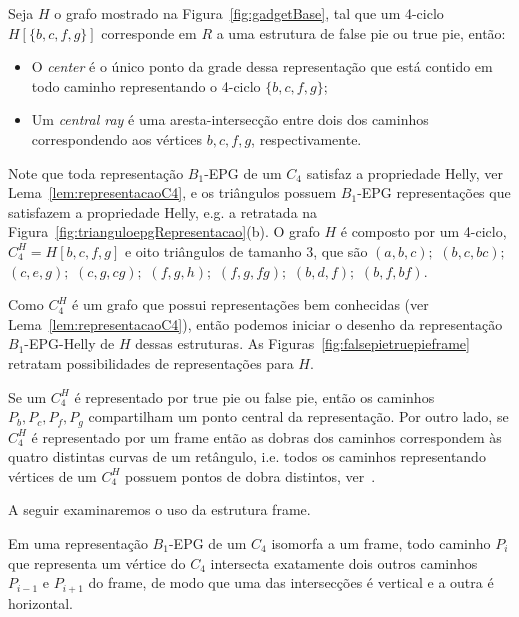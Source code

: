 \begin{definition}
Seja $H$ o grafo mostrado na  Figura~\ref{fig:gadgetBase}, tal que um 4-ciclo $H[\{b, c, f, g \}]$ corresponde em $R$ a uma estrutura de false pie ou true pie, então:

\begin{itemize}
\item O \emph{center} é o único ponto da grade dessa representação que está contido em todo caminho representando o 4-ciclo $ \{b, c, f, g \}$; \label{lab:lab1}

\item Um \emph {central ray} é uma aresta-intersecção entre dois dos caminhos correspondendo aos vértices $ b, c, f, g$, respectivamente.
\end{itemize}
\end{definition}


Note que toda representação $B_1$-EPG de um $C_4$ satisfaz a propriedade Helly, ver Lema~\ref{lem:representacaoC4}, e os triângulos possuem $B_1$-EPG representações que satisfazem a propriedade Helly, e.g. a retratada na Figura~\ref{fig:trianguloepgRepresentacao}(b). O grafo $H$ é composto por um 4-ciclo,  $C_4^{H}=H[b, c, f, g]$ e oito triângulos de tamanho 3, que são $(a,b,c);$ $(b,c,bc);$ $(c,e,g);$ $(c,g,cg);$ $(f,g,h);$ $(f,g,fg);$ $(b,d,f);$ $(b,f,bf).$

Como $C_4^{H}$ é um grafo que possui representações bem conhecidas (ver Lema~\ref{lem:representacaoC4}), então podemos iniciar o desenho da representação $B_{1}$-EPG-Helly de $H$ dessas estruturas. As  Figuras~\ref{fig:falsepietruepieframe} retratam possibilidades de representações para $H$.

Se um $C_4^{H}$ é representado por true pie ou false pie, então os caminhos $P_b, P_c, P_f, P_g$ compartilham um ponto central da representação. Por outro lado, se  $C_4^{H}$ é representado por um frame então as dobras dos caminhos correspondem às quatro distintas curvas de um retângulo, i.e. todos os caminhos representando  vértices de um $C_4^{H}$ possuem pontos de dobra distintos, ver~\cite{golumbic2009}.

A seguir examinaremos o uso da estrutura frame.


\begin{proposition}\label{lem:direcoesdiferentes}
Em uma representação $B_1$-EPG de um $C_4$ isomorfa a um frame, todo caminho  $P_i$ que representa um vértice do $C_4$ intersecta exatamente dois outros caminhos $P_{i-1}$ e $P_{i+1}$ do frame, de modo que uma das intersecções é vertical e a outra é horizontal. %
\end{proposition}

